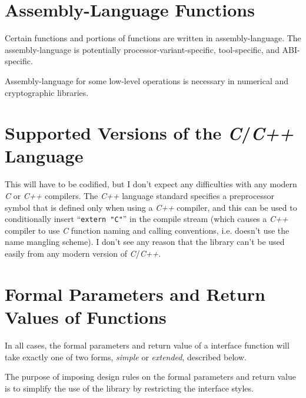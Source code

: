 \section{Assembly-Language Functions}
\label{cldd0:salf0}

Certain \emph{\productbasenameshort{}} functions and 
portions of functions are written in assembly-language.  The 
assembly-language is potentially 
pro\-ces\-sor-var\-i\-ant-spe\-cif\-ic, tool-spe\-cif\-ic, 
and ABI-spe\-cif\-ic.  

Assembly-language for some low-level operations is necessary 
in numerical and cryptographic libraries.  


\section{Supported Versions of the \emph{C}/\emph{C++} Language}
\label{cldd0:sscv0}

This will have to be codified, but I don't expect any 
difficulties with any modern \emph{C} or \emph{C++} 
compilers.  The \emph{C++} language standard specifies a 
preprocessor symbol that is defined only when using a 
\emph{C++} compiler, and this can be used to conditionally 
insert ``\texttt{extern "C"}'' in the compile stream (which 
causes a \emph{C++} compiler to use \emph{C} function naming 
and calling conventions, i.e.  doesn't use the name mangling 
scheme).  I don't see any reason that the library can't be 
used easily from any modern version of \emph{C}/\emph{C++}.  


\section{Formal Parameters and Return Values of Functions}
\label{cldd0:sfcp0}

In all cases, the formal parameters and return value of a 
\emph{\productbasenameshort{}} interface function will take 
exactly one of two forms, \emph{simple} or \emph{extended}, 
described below.  

The purpose of imposing design rules on the formal 
parameters and return value is to simplify the use of the 
library by restricting the \emph{\productbasenameshort{}} 
interface styles.  

